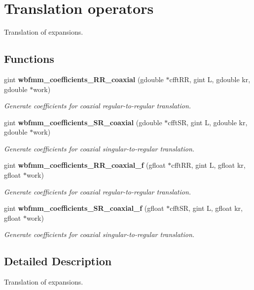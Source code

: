 \section{Translation operators}
\label{group__translations}


Translation of expansions.  


\subsection*{Functions}
\begin{DoxyCompactItemize}
\item 
gint {\bf wbfmm\+\_\+coefficients\+\_\+\+R\+R\+\_\+coaxial} (gdouble $\ast$cfft\+R\+R, gint L, gdouble kr, gdouble $\ast$work)
\begin{DoxyCompactList}\small\item\em Generate coefficients for coaxial regular-\/to-\/regular translation. \end{DoxyCompactList}\item 
gint {\bf wbfmm\+\_\+coefficients\+\_\+\+S\+R\+\_\+coaxial} (gdouble $\ast$cfft\+S\+R, gint L, gdouble kr, gdouble $\ast$work)
\begin{DoxyCompactList}\small\item\em Generate coefficients for coaxial singular-\/to-\/regular translation. \end{DoxyCompactList}\item 
gint {\bf wbfmm\+\_\+coefficients\+\_\+\+R\+R\+\_\+coaxial\+\_\+f} (gfloat $\ast$cfft\+R\+R, gint L, gfloat kr, gfloat $\ast$work)
\begin{DoxyCompactList}\small\item\em Generate coefficients for coaxial regular-\/to-\/regular translation. \end{DoxyCompactList}\item 
gint {\bf wbfmm\+\_\+coefficients\+\_\+\+S\+R\+\_\+coaxial\+\_\+f} (gfloat $\ast$cfft\+S\+R, gint L, gfloat kr, gfloat $\ast$work)
\begin{DoxyCompactList}\small\item\em Generate coefficients for coaxial singular-\/to-\/regular translation. \end{DoxyCompactList}\end{DoxyCompactItemize}


\subsection{Detailed Description}
Translation of expansions. 



